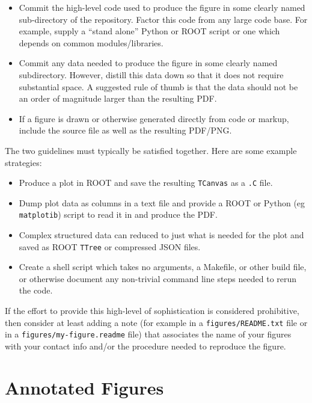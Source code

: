 \begin{itemize}
\item Commit the high-level code used to produce the figure in some
  clearly named sub-directory of the repository.  Factor this code
  from any large code base.  For example, supply a ``stand alone''
  Python or ROOT script or one which depends on common
  modules/libraries.
  
\item Commit any data needed to produce the figure in some clearly
  named subdirectory.  However, distill this data down so that it does
  not require substantial space.  A suggested rule of thumb is that
  the data should not be an order of magnitude larger than the
  resulting PDF.

\item If a figure is drawn or otherwise generated directly from code
  or markup, include the source file as well as the resulting PDF/PNG.

\end{itemize}

The two guidelines must typically be satisfied together.  Here are
some example strategies:

\begin{itemize}
\item Produce a plot in ROOT and save the resulting \texttt{TCanvas}
  as a \texttt{.C} file.
\item Dump plot data as columns in a text file and provide a ROOT or
  Python (eg \texttt{matplotib}) script to read it in and produce the
  PDF.
\item Complex structured data can reduced to just what is needed for
  the plot and saved as ROOT \texttt{TTree} or compressed JSON files.
\item Create a shell script which takes no arguments, a Makefile, or
  other build file, or otherwise document any non-trivial command line
  steps needed to rerun the code.
\end{itemize}

If the effort to provide this high-level of sophistication is
considered prohibitive, then consider at least adding a note (for
example in a \texttt{figures/README.txt} file or in a
\texttt{figures/my-figure.readme} file) that associates the name of
your figures with your contact info and/or the procedure needed to
reproduce the figure.

\section{Annotated Figures}
\label{sec:graphic-annotate}

